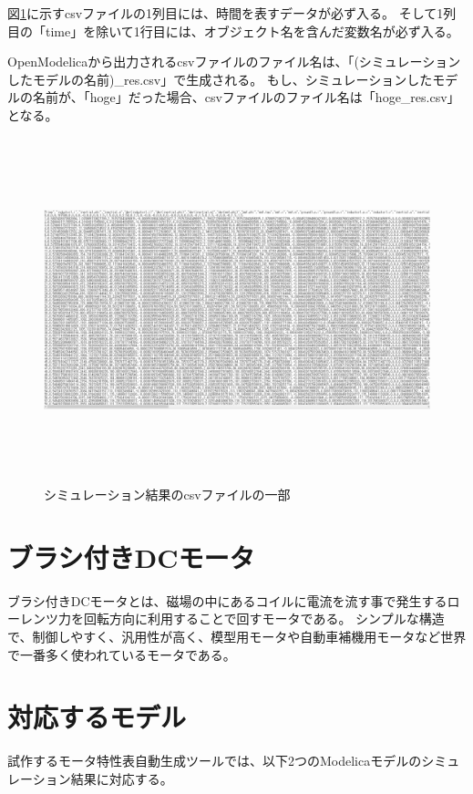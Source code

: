 図\ref{fig:simyu_csv}に示すcsvファイルの1列目には、時間を表すデータが必ず入る。
そして1列目の「time」を除いて1行目には、オブジェクト名を含んだ変数名が必ず入る。

OpenModelicaから出力されるcsvファイルのファイル名は、「(シミュレーションしたモデルの名前)\_res.csv」で生成される。
もし、シミュレーションしたモデルの名前が、「hoge」だった場合、csvファイルのファイル名は「hoge\_res.csv」となる。\\
\begin{figure}[t]
	\centering
	\includegraphics[width=16.5cm,height=10cm]{./Image/simyu_csv.png}
	\caption{シミュレーション結果のcsvファイルの一部}
	\label{fig:simyu_csv}
\end{figure}
\section{ブラシ付きDCモータ}\label{}
ブラシ付きDCモータとは、磁場の中にあるコイルに電流を流す事で発生するローレンツ力を回転方向に利用することで回すモータである\cite{モータ原理}。
シンプルな構造で、制御しやすく、汎用性が高く、模型用モータや自動車補機用モータなど世界で一番多く使われているモータである\cite{モータ使う}。
\section{対応するモデル}\label{taioumodel}
試作するモータ特性表自動生成ツールでは、以下2つのModelicaモデルのシミュレーション結果に対応する。
